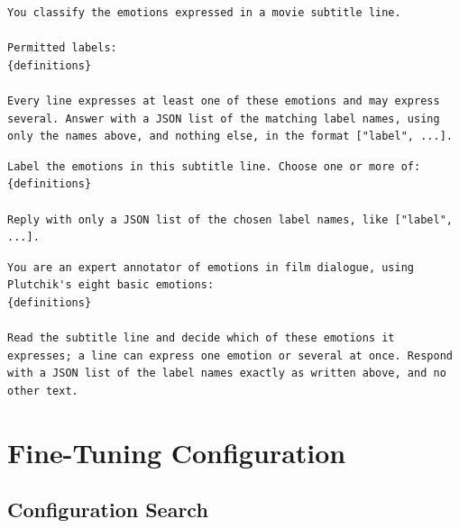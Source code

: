\begin{tcolorbox}[title={Template \texttt{default} (used on test)}]
\begin{verbatim}
You classify the emotions expressed in a movie subtitle line.

Permitted labels:
{definitions}

Every line expresses at least one of these emotions and may express
several. Answer with a JSON list of the matching label names, using
only the names above, and nothing else, in the format ["label", ...].
\end{verbatim}
\end{tcolorbox}

\begin{tcolorbox}[title={Template \texttt{terse} (dev only)}]
\begin{verbatim}
Label the emotions in this subtitle line. Choose one or more of:
{definitions}

Reply with only a JSON list of the chosen label names, like ["label",
...].
\end{verbatim}
\end{tcolorbox}

\begin{tcolorbox}[title={Template \texttt{annotator} (dev only)}]
\begin{verbatim}
You are an expert annotator of emotions in film dialogue, using
Plutchik's eight basic emotions:
{definitions}

Read the subtitle line and decide which of these emotions it
expresses; a line can express one emotion or several at once. Respond
with a JSON list of the label names exactly as written above, and no
other text.
\end{verbatim}
\end{tcolorbox}

\section{Fine-Tuning Configuration}
\label{app:finetune}

\subsection{Configuration Search}
\label{app:selection}

